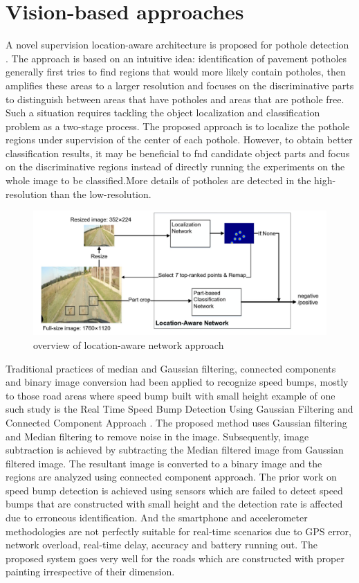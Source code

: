 \section{Vision-based approaches}
A novel supervision location-aware architecture is proposed for pothole detection \cite{R12}. The approach is based on an intuitive idea: identification of pavement potholes generally first tries to find regions that would more likely contain potholes, then amplifies these areas to a larger resolution and focuses on the discriminative parts to distinguish between areas that have potholes and areas that are pothole free. Such a situation requires tackling the object localization and classification problem as a two-stage process. The proposed approach is to localize the pothole regions under supervision of the center of each pothole. However, to obtain better classification results, it may be beneficial to fnd candidate object parts and focus on the discriminative regions instead of directly running the experiments on the whole image to be classified.More details of potholes are detected in the high-resolution than the low-resolution.
\begin{figure}[H]
    \centering
    \includegraphics[scale=0.7]{Figures/chapter2/vision1.png}
    \caption{overview of location-aware network approach}
    \label{fig:my_label}
\end{figure}

\noindent
Traditional practices of median and Gaussian filtering,
connected components and binary image conversion had been
applied to recognize speed bumps, mostly to those road areas
where speed bump built with small height example of one such study is the Real Time Speed Bump Detection Using Gaussian Filtering and Connected Component Approach \cite{R13}. The proposed method uses Gaussian filtering and Median filtering to remove noise in the image. Subsequently, image subtraction is achieved by subtracting the Median filtered image from Gaussian filtered image. The resultant image is converted to a binary image and the regions are analyzed using connected component approach. The prior work on speed bump detection is achieved using sensors which are failed to detect speed bumps that are constructed with small height and the detection rate is affected due to erroneous identification. And the smartphone and accelerometer methodologies are not perfectly suitable for real-time scenarios due to GPS error, network overload, real-time delay, accuracy and battery running out. The proposed system goes very well for the roads which are constructed with proper painting irrespective of their dimension.

